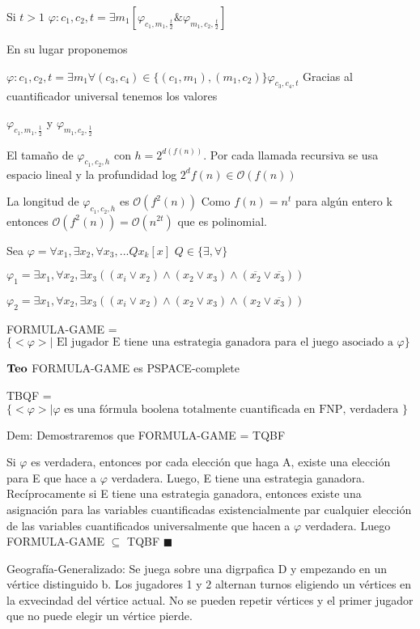 \documentclass{homework}
\begin{document}
Si $t > 1$ $\varphi:{c_1,c_2,t} = \exists m_1 [\varphi_{c_1,m_1,\frac{t}{2}} \& \varphi_{m_1,c_2,\frac{t}{2}}]$

En su lugar proponemos

$\varphi:{c_1,c_2,t} = \exists m_1 \forall (c_3,c_4) \in \{(c_1,m_1), (m_1,c_2)\} \varphi_{c_3,c_4,t}$ Gracias al cuantificador universal tenemos los valores

$\varphi_{c_1,m_1,\frac{1}{2}}$ y $\varphi_{m_1,c_2,\frac{1}{2}}$

El tamaño de $\varphi_{c_1,c_2,h}$ con $h = 2^{d(f(n))}$. Por cada llamada recursiva se usa espacio lineal y la profundidad log $2^df(n) \in \mathcal{O}(f(n))$

La longitud de $\varphi_{c_1,c_2,h}$ es $\mathcal{O}(f^2(n))$ Como $f(n) = n^t$ para algún entero k entonces $\mathcal{O}(f^2(n)) = \mathcal{O}(n^{2t})$ que es polinomial.
 
Sea $\varphi = \forall x_1, \exists x_2, \forall x_3, ... Qx_k [x]$ $Q \in \{\exists, \forall\}$

$\varphi_1 = \exists x_1, \forall x_2, \exists x_3 ((x_i \vee x_2) \wedge (x_2 \vee  x_3) \wedge (\overline{x_2} \vee \overline{x_3}) )$

$\varphi_2 = \exists x_1, \forall x_2, \exists x_3 ((x_i \vee x_2) \wedge (x_2 \vee  x_3) \wedge (x_2 \vee \overline{x_3}) )$

FORMULA-GAME = $\{<\varphi>| \text{ El jugador E tiene una estrategia ganadora para el juego asociado a } \varphi\}$

$\bf{Teo}$ FORMULA-GAME es PSPACE-complete

TBQF = $\{<\varphi>| \varphi \text{ es una fórmula boolena totalmente cuantificada en FNP, verdadera }\}$

Dem: Demostraremos que FORMULA-GAME = TQBF

Si $\varphi$ es verdadera, entonces por cada elección que haga A, existe una elección para E que hace a $\varphi$ verdadera. Luego, E tiene una estrategia ganadora. Recíprocamente si E tiene una estrategia ganadora, entonces existe una asignación para las variables cuantificadas existencialmente par cualquier elección de las variables cuantificados universalmente que hacen a $\varphi$ verdadera. Luego FORMULA-GAME $\subseteq$ TQBF $\blacksquare$

Geografía-Generalizado: Se juega sobre una digrpafica D y empezando en un vértice distinguido b. Los jugadores 1 y 2 alternan turnos eligiendo un vértices en la exvecindad del vértice actual. No se pueden repetir vértices y el primer jugador que no puede elegir un vértice pierde.
\end{document}
